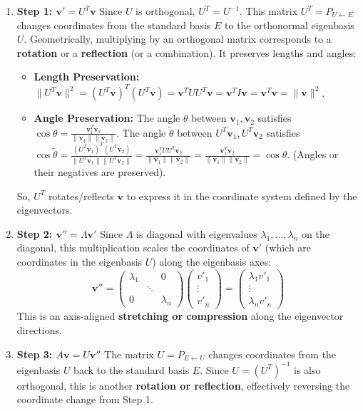 \documentclass[11pt]{article}
\theoremstyle{definition}
\theoremstyle{remark}
\begin{document}
\begin{enumerate}
    \item \textbf{Step 1: $\mathbf{v}' = U^T \mathbf{v}$}
        Since $U$ is orthogonal, $U^T = U^{-1}$. This matrix $U^T = P_{U \leftarrow E}$ changes coordinates from the standard basis $E$ to the orthonormal eigenbasis $U$. Geometrically, multiplying by an orthogonal matrix corresponds to a \textbf{rotation} or a \textbf{reflection} (or a combination). It preserves lengths and angles:
        \begin{itemize}
            \item \textbf{Length Preservation:} $\|U^T \mathbf{v}\|^2 = (U^T \mathbf{v})^T (U^T \mathbf{v}) = \mathbf{v}^T U U^T \mathbf{v} = \mathbf{v}^T I \mathbf{v} = \mathbf{v}^T \mathbf{v} = \|\mathbf{v}\|^2$.
            \item \textbf{Angle Preservation:} The angle $\theta$ between $\mathbf{v}_1, \mathbf{v}_2$ satisfies $\cos \theta = \frac{\mathbf{v}_1^T \mathbf{v}_2}{\|\mathbf{v}_1\| \|\mathbf{v}_2\|}$. The angle $\tilde{\theta}$ between $U^T\mathbf{v}_1, U^T\mathbf{v}_2$ satisfies $\cos \tilde{\theta} = \frac{(U^T \mathbf{v}_1)^T (U^T \mathbf{v}_2)}{\|U^T \mathbf{v}_1\| \|U^T \mathbf{v}_2\|} = \frac{\mathbf{v}_1^T U U^T \mathbf{v}_2}{\|\mathbf{v}_1\| \|\mathbf{v}_2\|} = \frac{\mathbf{v}_1^T \mathbf{v}_2}{\|\mathbf{v}_1\| \|\mathbf{v}_2\|} = \cos \theta$. (Angles or their negatives are preserved).
        \end{itemize}
        So, $U^T$ rotates/reflects $\mathbf{v}$ to express it in the coordinate system defined by the eigenvectors.

    \item \textbf{Step 2: $\mathbf{v}'' = \Lambda \mathbf{v}'$}
        Since $\Lambda$ is diagonal with eigenvalues $\lambda_1, \dots, \lambda_n$ on the diagonal, this multiplication scales the coordinates of $\mathbf{v}'$ (which are coordinates in the eigenbasis $U$) along the eigenbasis axes:
        \[ \mathbf{v}'' = \begin{pmatrix} \lambda_1 & & 0 \\ & \ddots & \\ 0 & & \lambda_n \end{pmatrix} \begin{pmatrix} v'_1 \\ \vdots \\ v'_n \end{pmatrix} = \begin{pmatrix} \lambda_1 v'_1 \\ \vdots \\ \lambda_n v'_n \end{pmatrix} \]
        This is an axis-aligned \textbf{stretching or compression} along the eigenvector directions.

    \item \textbf{Step 3: $A\mathbf{v} = U \mathbf{v}''$}
        The matrix $U = P_{E \leftarrow U}$ changes coordinates from the eigenbasis $U$ back to the standard basis $E$. Since $U = (U^T)^{-1}$ is also orthogonal, this is another \textbf{rotation or reflection}, effectively reversing the coordinate change from Step 1.
\end{enumerate}
\end{document}
